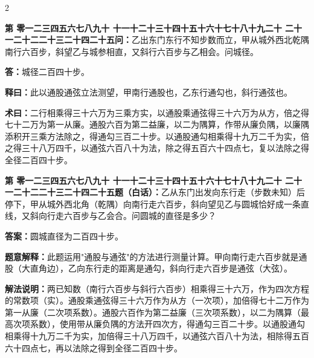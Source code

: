 \documentclass[10pt,a4paper]{article}
\newcounter{probnum}
\newcounter{probnumvol}[section]
\newcommand{\chnum}[1]{%
  \ifcase#1 零\or 一\or 二\or 三\or 四\or 五\or 六\or 七\or 八\or 九\or 十\or
    十一\or 十二\or 十三\or 十四\or 十五\or 十六\or 十七\or 十八\or 十九\or 二十\or
    二十一\or 二十二\or 二十三\or 二十四\or 二十五\fi}
\newcommand{\problemclassical}[1]{%
  \stepcounter{probnumvol}%
  \par\noindent
  \textcolor{classicalcolor}{\textbf{第\chnum{\value{probnumvol}}问：}}#1\par\smallskip
}
\newcommand{\problemmodern}[1]{%
  \par\noindent
  \textcolor{moderncolor}{\textbf{第\chnum{\value{probnumvol}}题（白话）：}}#1\par\smallskip
}
\newcommand{\answerclassical}[1]{%
  \par\noindent\textcolor{classicalcolor}{\textbf{答：}}#1\par
}
\newcommand{\answermodern}[1]{%
  \par\noindent\textcolor{moderncolor}{\textbf{答案：}}#1\par
}
\newcommand{\shiyiclassical}[1]{%
  \par\noindent\textcolor{classicalcolor}{\textbf{释曰：}}#1\par
}
\newcommand{\shiyimodern}[1]{%
  \par\noindent\textcolor{moderncolor}{\textbf{题意解释：}}#1\par
}
\newcommand{\shuyueclassical}[1]{%
  \par\noindent\textcolor{classicalcolor}{\textbf{术曰：}}#1\par
}
\newcommand{\shuyuemodern}[1]{%
  \par\noindent\textcolor{moderncolor}{\textbf{解法说明：}}#1\par
}
\begin{document}
\begin{paracol}{2}

\problemclassical{乙出东门东行不知步数而立，甲从城外西北乾隅南行六百步，斜望乙与城参相直，又斜行六百步与乙相会。问城径。}

\answerclassical{城径二百四十步。}

\shiyiclassical{此以通股通弦立法测望，甲南行通股也，乙东行通勾也，斜行通弦也。}

\shuyueclassical{二行相乘得三十六万为三乘方实，以通股乘通弦得三十六万为从方，倍之得七十二万为第一从廉。通股六百为第二益廉，以二为隅算，作带从廉负隅，以廉隅添积开三乘方法除之，得通勾三百二十步。以通股通勾相乘得十九万二千为实，倍之得三十八万四千，以通弦六百八十为法，除之得五百六十四点七，复以法除之得全径二百四十步。}

\switchcolumn

\problemmodern{乙从东门出发向东行走（步数未知）后停下，甲从城外西北角（乾隅）向南行走六百步，斜向望见乙与圆城恰好成一条直线，又斜向行走六百步与乙会合。问圆城的直径是多少？}

\answermodern{圆城直径为二百四十步。}

\shiyimodern{此题运用"通股与通弦"的方法进行测量计算。甲向南行走六百步就是通股（大直角边），乙向东行走的距离是通勾，斜向行走六百步是通弦（大弦）。}

\shuyuemodern{两已知数（南行六百步与斜行六百步）相乘得三十六万，作为四次方程的常数项（实）。通股乘通弦得三十六万作为从方（一次项），加倍得七十二万作为第一从廉（二次项系数）。通股六百作为第二益廉（三次项系数），以二为隅算（最高次项系数），使用带从廉负隅的方法开四次方，得通勾三百二十步。以通股通勾相乘得十九万二千为实，加倍得三十八万四千，以通弦六百八十为法，相除得五百六十四点七，再以法除之得到全径二百四十步。}

\end{paracol}

\vspace{0.3cm}
\end{document}
